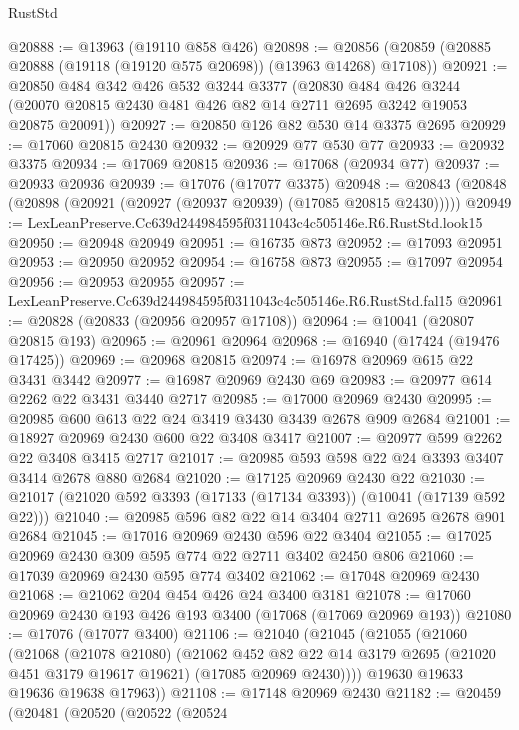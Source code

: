 \begin{lexlean}{RustStd}
\begin{coremodule}
@20888 := @13963 (@19110 @858 @426)
@20898 := @20856 (@20859 (@20885 @20888 (@19118 (@19120 @575 @20698)) (@13963 @14268) @17108))
@20921 := @20850
    @484
    @342
    @426
    @532
    @3244
    @3377
    (@20830
      @484
      @426
      @3244
      (@20070 @20815 @2430 @481 @426 @82 @14 @2711 @2695 @3242 @19053 @20875 @20091))
@20927 := @20850 @126 @82 @530 @14 @3375 @2695
@20929 := @17060 @20815 @2430
@20932 := @20929 @77 @530 @77
@20933 := @20932 @3375
@20934 := @17069 @20815
@20936 := @17068 (@20934 @77)
@20937 := @20933 @20936
@20939 := @17076 (@17077 @3375)
@20948 := @20843 (@20848 (@20898 (@20921 (@20927 (@20937 @20939) (@17085 @20815 @2430)))))
@20949 := LexLeanPreserve.Cc639d244984595f0311043c4c505146e.R6.RustStd.look15
@20950 := @20948 @20949
@20951 := @16735 @873
@20952 := @17093 @20951
@20953 := @20950 @20952
@20954 := @16758 @873
@20955 := @17097 @20954
@20956 := @20953 @20955
@20957 := LexLeanPreserve.Cc639d244984595f0311043c4c505146e.R6.RustStd.fal15
@20961 := @20828 (@20833 (@20956 @20957 @17108))
@20964 := @10041 (@20807 @20815 @193)
@20965 := @20961 @20964
@20968 := @16940 (@17424 (@19476 @17425))
@20969 := @20968 @20815
@20974 := @16978 @20969 @615 @22 @3431 @3442
@20977 := @16987 @20969 @2430 @69
@20983 := @20977 @614 @2262 @22 @3431 @3440 @2717
@20985 := @17000 @20969 @2430
@20995 := @20985 @600 @613 @22 @24 @3419 @3430 @3439 @2678 @909 @2684
@21001 := @18927 @20969 @2430 @600 @22 @3408 @3417
@21007 := @20977 @599 @2262 @22 @3408 @3415 @2717
@21017 := @20985 @593 @598 @22 @24 @3393 @3407 @3414 @2678 @880 @2684
@21020 := @17125 @20969 @2430 @22
@21030 := @21017 (@21020 @592 @3393 (@17133 (@17134 @3393)) (@10041 (@17139 @592 @22)))
@21040 := @20985 @596 @82 @22 @14 @3404 @2711 @2695 @2678 @901 @2684
@21045 := @17016 @20969 @2430 @596 @22 @3404
@21055 := @17025 @20969 @2430 @309 @595 @774 @22 @2711 @3402 @2450 @806
@21060 := @17039 @20969 @2430 @595 @774 @3402
@21062 := @17048 @20969 @2430
@21068 := @21062 @204 @454 @426 @24 @3400 @3181
@21078 := @17060 @20969 @2430 @193 @426 @193 @3400 (@17068 (@17069 @20969 @193))
@21080 := @17076 (@17077 @3400)
@21106 := @21040
    (@21045
      (@21055
        (@21060
          (@21068
            (@21078 @21080)
            (@21062
              @452
              @82
              @22
              @14
              @3179
              @2695
              (@21020 @451 @3179 @19617 @19621)
              (@17085 @20969 @2430))))
        @19630
        @19633
        @19636
        @19638
        @17963))
@21108 := @17148 @20969 @2430
@21182 := @20459
    (@20481
      (@20520
        (@20522
          (@20524

\end{coremodule}
\end{lexlean}
